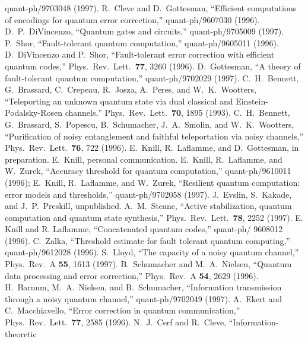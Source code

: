 \begin{thebibliography}{99}
	quant-ph/9703048 (1997).
	 R.~Cleve and D.~Gottesman, ``Efficient computations of
	encodings for quantum error correction,'' quant-ph/9607030 (1996).
	 D.~P.~DiVincenzo, ``Quantum gates and circuits,''
	quant-ph/9705009 (1997).
	 P.~Shor, ``Fault-tolerant quantum computation,''
	quant-ph/9605011 (1996).
	 D.~DiVincenzo and P.~Shor, ``Fault-tolerant error
	correction with efficient quantum codes,'' Phys.\ Rev.\ Lett.\ {\bf 77},
	3260 (1996).
	 D.~Gottesman, ``A theory of fault-tolerant
	quantum computation,'' quant-ph/9702029 (1997).
	 C.~H.~Bennett, G.~Brassard, C.~Crepeau, R.~Josza,
	A.~Peres, and W.~K.~Wootters, ``Teleporting an unknown quantum state via dual
	classical and Einstein-Podalsky-Rosen channels,'' Phys.\ Rev.\ Lett.\ {\bf 70},
	1895 (1993).
	 C.~H.~Bennett, G.~Brassard, S.~Popescu, B.~Schumacher,
	J.~A.~Smolin, and W.~K.~Wootters, ``Purification of noisy entanglement and
	faithful teleportation via noisy channels,'' Phys.\ Rev.\ Lett.\ {\bf 76},
	722 (1996).
	 E.~Knill, R.~Laflamme, and D.~Gottesman, in
	preparation.
	 E.~Knill, personal communication.
	 E.~Knill, R.~Laflamme, and W.~Zurek, ``Accuracy
	threshold for quantum computation,'' quant-ph/9610011 (1996); E.~Knill,
	R.~Laflamme, and W.~Zurek, ``Resilient quantum computation: error models
	and thresholds,'' quant-ph/9702058 (1997).
	 J.~Evslin, S.~Kakade, and J.~P.~Preskill, unpublished.
	 A.~M.~Steane, ``Active stabilization, quantum
	computation and quantum state synthesis,'' Phys.\ Rev.\ Lett.\ {\bf 78},
	2252 (1997).
	 E. Knill and R. Laflamme, ``Concatenated
	quantum codes,'' quant-ph/ 9608012 (1996).
	 C.~Zalka, ``Threshold estimate for fault tolerant quantum
	computing,'' quant-ph/9612028 (1996).
	 S.~Lloyd, ``The capacity of a noisy quantum channel,''
	Phys.\ Rev.\ A {\bf 55}, 1613 (1997).
	 B.~Schumacher and M.~A.~Nielsen, ``Quantum data
	processing and error correction,'' Phys.\ Rev.\ A {\bf 54}, 2629 (1996).
	 H.~Barnum, M.~A.~Nielsen, and B.~Schumacher, ``Information
	transmission through a noisy quantum channel,'' quant-ph/9702049 (1997).
	 A.~Ekert and C.~Macchiavello, ``Error correction in quantum
	communication,'' Phys.\ Rev.\ Lett.\ {\bf 77}, 2585 (1996).
	 N.~J.~Cerf and R.~Cleve, ``Information-theoretic

\end{thebibliography}

